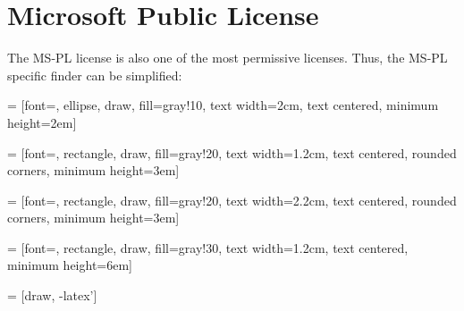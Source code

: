 %
%
%
%
%



\section{Microsoft Public License}


The MS-PL license is also one of the most permissive licenses. Thus, the
MS-PL specific finder can be simplified:


 = [font=\small, ellipse, draw, fill=gray!10, 
    text width=2cm, text centered, minimum height=2em]

 = [font=\footnotesize, rectangle, draw, fill=gray!20, 
    text width=1.2cm, text centered, rounded corners, minimum height=3em]

 = [font=\footnotesize, rectangle, draw, fill=gray!20, 
    text width=2.2cm, text centered, rounded corners, minimum height=3em]
    
 = [font=\tiny, rectangle, draw, fill=gray!30, 
    text width=1.2cm, text centered, minimum height=6em]

 = [draw, -latex']

